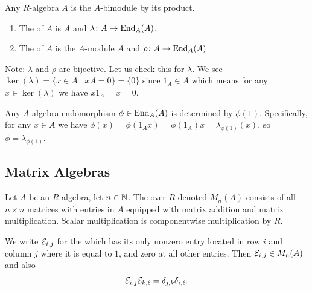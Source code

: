 
\lecture{}

\begin{definition}
Any $R$-algebra $A$ is the $A$-bimodule by its product.
\begin{enumerate}
\item The  of $A$ is $A$ and $\lambda\colon A\to\operatorname{End}_{A}(A)$.
\item The  of $A$ is the
  $A$-module $A$ and $\rho\colon A\to\operatorname{End}_{A}(A)$
\end{enumerate}
\end{definition}

\begin{node}
Note: $\lambda$ and $\rho$ are bijective.
Let us check this for $\lambda$. We see $\ker(\lambda)=\{x\in A\mid xA=0\}=\{0\}$
since $1_{A}\in A$ which means for any $x\in\ker(\lambda)$ we have $x1_{A}=x=0$.
\end{node}

\begin{node}
Any $A$-algebra endomorphism $\phi\in\operatorname{End}_{A}(A)$ is determined by
$\phi(1)$. Specifically, for any $x\in A$ we have $\phi(x)=\phi(1_{A}x)=\phi(1_{A})x=\lambda_{\phi(1)}(x)$,
so $\phi=\lambda_{\phi(1)}$.
\end{node}

\subsection{Matrix Algebras}

\begin{definition}
Let $A$ be an $R$-algebra, let $n\in\mathbb{N}$. The  over $R$ denoted $M_{n}(A)$ consists of all $n\times n$
matrices with entries in $A$ equipped with matrix addition and matrix
multiplication. Scalar multiplication is componentwise multiplication
by $R$.
\end{definition}

\begin{notation}
We write $\mathcal{E}_{i,j}$ for the  which has
its only nonzero entry located in row $i$ and column $j$ where it is
equal to $1$, and zero at all other entries. Then $\mathcal{E}_{i,j}\in M_{n}(A)$
and also
\begin{equation}
\mathcal{E}_{i,j}\mathcal{E}_{k,\ell}=\delta_{j,k}\delta_{i,\ell}.
\end{equation}
\end{notation}

